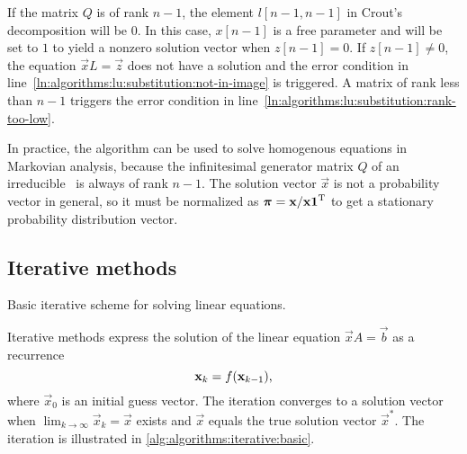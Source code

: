 If the matrix $Q$ is of rank $n - 1$, the element $l[n - 1, n - 1]$ in
Crout's  decomposition will be $0$. In this case,
$x[n - 1]$ is a free parameter and will be set to $1$ to yield a
nonzero solution vector when $z[n - 1] = 0$. If $z[n - 1] \ne 0$, the
equation $\vec{x} L = \vec{z}$ does not have a solution and the error
condition in line~\ref{ln:algorithms:lu:substitution:not-in-image} is
triggered. A matrix of rank less than $n - 1$ triggers the error
condition in line~\ref{ln:algorithms:lu:substitution:rank-too-low}.

In practice, the algorithm can be used to solve homogenous equations
in Markovian analysis, because the infinitesimal generator matrix $Q$
of an irreducible \CTMC\ is always of rank $n - 1$. The solution
vector $\vec{x}$ is not a probability vector in general, so it must be
normalized as $\vec{\pi} = \vec{x} / \vec{x} \vec{1}^\T$ to get a
stationary probability distribution vector.

\subsection{Iterative methods}

\begin{algorithm}
  \;
  \caption{Basic iterative scheme for solving linear equations.}
  \label{alg:algorithms:iterative:basic}
\end{algorithm}

Iterative methods express the solution of the linear equation $\vec{x}
A = \vec{b}$ as a recurrence
\begin{equation}
  \vec{x}_{k} = f(\vec{x}_{k - 1}) \text,
\end{equation}
where $\vec{x}_0$ is an initial guess vector. The iteration converges
to a solution vector when $\lim_{k \to \infty} \vec{x}_k = \vec{x}$
exists and $\vec{x}$ equals the true solution vector $\vec{x}^*$. The
iteration is illustrated in \vref{alg:algorithms:iterative:basic}.

